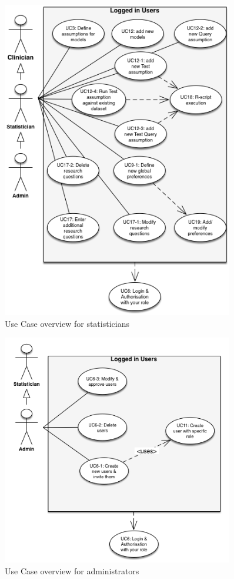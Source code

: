 \begin{figure}[!h]
\centering
\includegraphics[width=0.9\textwidth]{figures/use_case_statistician}
\caption{Use Case overview for statisticians}
\label{fig:usecase:statistician}
\end{figure}


\begin{figure}[!h]
\centering
\includegraphics[width=0.9\textwidth]{figures/use_case_admin}
\caption{Use Case overview for administrators}
\label{fig:usecase:admin}
\end{figure}



